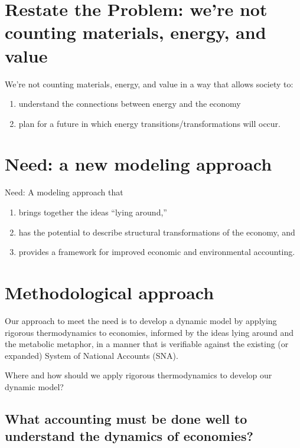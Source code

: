 \section{Restate the Problem: we're not counting materials, energy, and value}
\label{sec:restate_problem}

We’re not counting materials, energy, and value in a way that allows society to: 
\begin{enumerate}
	\item understand the connections between energy and the economy
	\item plan for a future in which energy transitions/transformations will occur.
\end{enumerate} 




\section{Need: a new modeling approach}
\label{sec:need}

Need: A modeling approach that
\begin{enumerate}
	\item brings together the ideas ``lying around,''
	\item has the potential to describe structural transformations of the economy, and 
	\item provides a framework for improved economic and environmental accounting.
\end{enumerate} 


\section{Methodological approach}
\label{sec:approach}

Our approach to meet the need is to develop a dynamic model by applying rigorous thermodynamics to economies, informed by the ideas lying around and the metabolic metaphor, in a manner that is verifiable against the existing (or expanded) System of National Accounts (SNA).

Where and how should we apply rigorous thermodynamics to develop our dynamic model? 

\subsection{What accounting must be done well to understand the dynamics of economies?}
\label{sec:structure}

